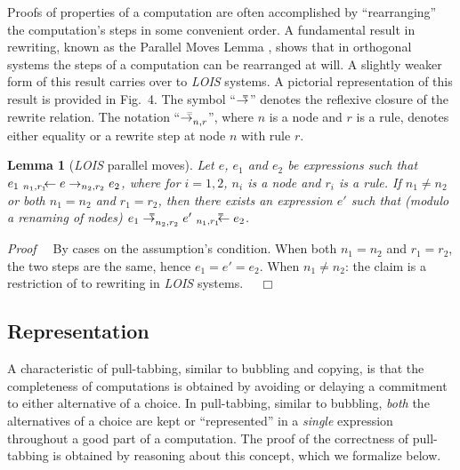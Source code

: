 \documentclass{mytlp}
\newcommand{\inparen}[1]{\mbox{\rm (}#1\mbox{\rm )}}
\newcommand{\modulo}{\inparen{modulo a renaming of nodes}}
\newtheorem{lemma}{Lemma}
\newcommand{\myproof}[1]{
  \ifx\showproof\undefined
\else
\mbox{\it Proof\ \ } #1 ~~$\Box$ \\[2ex]
  \fi
}
\def\showproof{}
\newcommand{\toequal}{\to^{\llap{\raisebox{.3ex}{\tiny $=$}}}}
\newcommand{\leftequal}{{}^{\rlap{\ \raisebox{.3ex}{\tiny $=$}}}\leftarrow}
\begin{document}
Proofs of properties of a computation are often accomplished
by ``rearranging'' the computation's steps in some convenient order.
A fundamental result in rewriting, known as
the Parallel Moves Lemma \cite{HuetLevy91},
shows that in orthogonal systems the steps of a computation
can be rearranged at will.
A slightly weaker form of this result carries over
to \emph{LOIS} systems.
A pictorial representation of this result
is provided in Fig.~4. The symbol ``$\toequal$'' denotes the reflexive closure
of the rewrite relation.
The notation ``$\toequal_{n,r}$'', where $n$ is a node and $r$
is a rule, denotes either equality or a rewrite step at
node $n$ with rule $r$.

\def\lemmapmoves{
\begin{lemma}[\emph{LOIS} parallel moves]
\label{parallel-moves}
Let $e$, $e_1$ and $e_2$ be expressions such that
$e_1\ {_{n_1,r_1}}\kern-1.25ex\leftarrow e \to_{n_2,r_2} e_2$,
where for $i=1,2$, $n_i$ is a node and $r_i$ is a rule.
If $n_1 \ne n_2$ or both $n_1 = n_2$ and $r_1 = r_2$,
then there exists an expression $e'$ such that 
\modulo{}
$e_1 \toequal_{n_2,r_2}  e'\  {_{n_1,r_1}}\kern-1.25ex\leftequal e_2$.
\end{lemma}
\myproof{
By cases on the assumption's condition.
When both $n_1 = n_2$ and $r_1 = r_2$,
the two steps are the same, hence $e_1 = e' = e_2$.
When $n_1 \ne n_2$: the claim is a restriction
of \cite[Lemma 20]{Antoy97ALP} to rewriting in \emph{LOIS} systems.
}
}

\lemmapmoves


\subsection{Representation}

A characteristic of
pull-tabbing, similar to bubbling and copying,
is that the completeness of computations is obtained
by avoiding or delaying a commitment to
either alternative of a choice.
In pull-tabbing, similar to bubbling, \emph{both}
the alternatives of a choice are
kept or ``represented'' in a \emph{single} expression
throughout a good part of a computation.
The proof of the correctness of pull-tabbing
is obtained by reasoning about this concept,
which we formalize below.
\end{document}
